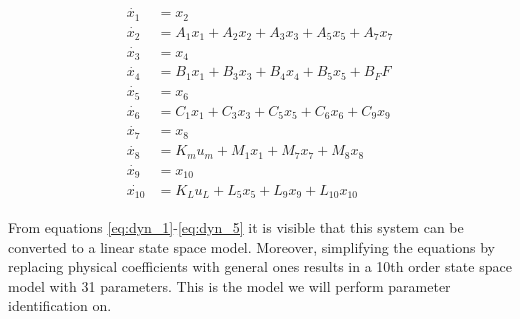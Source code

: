 \begin{gather}
\begin{align}
\dot{x_1} &= x_2\\
\dot{x_2} &= A_1x_1 + A_2x_2 + A_3x_3 + A_5x_5 + A_7x_7\\
\dot{x_3} &= x_4\\
\dot{x_4} &= B_1x_1 + B_3x_3 + B_4x_4 + B_5x_5 + B_FF\\
\dot{x_5} &= x_6\\
\dot{x_6} &= C_1x_1 + C_3x_3 + C_5x_5 + C_6x_6 + C_9x_9\\
\dot{x_7} &= x_8\\
\dot{x_8} &= K_mu_m + M_1x_1 + M_7x_7 + M_8x_8\\
\dot{x_9} &= x_{10}\\
\dot{x_{10}} &= K_Lu_L + L_5x_5 + L_9x_9 + L_{10}x_{10}
\end{align}
\end{gather}



From equations \ref{eq:dyn_1}-\ref{eq:dyn_5} it is visible that this system can be converted to a linear state space model.
Moreover, simplifying the equations by replacing physical coefficients with general ones results in a 10th order state space model with 31 parameters.
This is the model we will perform parameter identification on.

